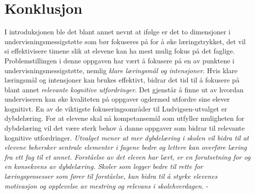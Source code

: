 \documentclass[main.tex]{subfiles}
\begin{document}
\section*{Konklusjon}
\label{sec:6}

I introduksjonen ble det blant annet nevnt at ifølge  er det to dimensjoner i 
undervisningsmessigstøtte som bør fokuseres på for å øke læringstrykket, det vil si effektivisere 
timene slik at elevene kan ha mest mulig fokus på det faglige. Problemstillingen i denne oppgaven har 
vært å fokusere på en av punktene i undervisningsmessigstøtte, nemlig \emph{klare læringsmål og 
intensjoner}. Hvis klare læringsmål og intensjoner kan brukes effektivt, bidrar det tid til å fokusere 
på blant annet \emph{relevante kognitive utfordringer}. Det gjenstår å finne ut av hvordan 
underviseren kan øke kvaliteten på oppgaver ogdermed utfordre sine elever kognitivt. En av de 
viktigste fokuseringsområder til Ludvigsen-utvalget er dybdelæring. For at elevene
skal nå kompetansemål som utfyller muligheten for dybdelæring vil det være sterk behov å danne 
oppgaver som bidrar til relevante kognitive utfordringer. 
\newline
\newline
\emph{
Utvalget mener at mer dybdelæring i skolen vil bidra til at elevene behersker sentrale elementer
i fagene bedre og lettere kan overføre læring fra ett fag til et annet. Forståelse av det eleven har
lært, er en forutsetning for og en konsekvens av dybdelæring. Skoler som legger bedre til rette for
læringsprosesser som fører til forståelse, kan bidra til å styrke elevenes motivasjon og opplevelse
av mestring og relevans i skolehverdagen.} - 
\end{document}
